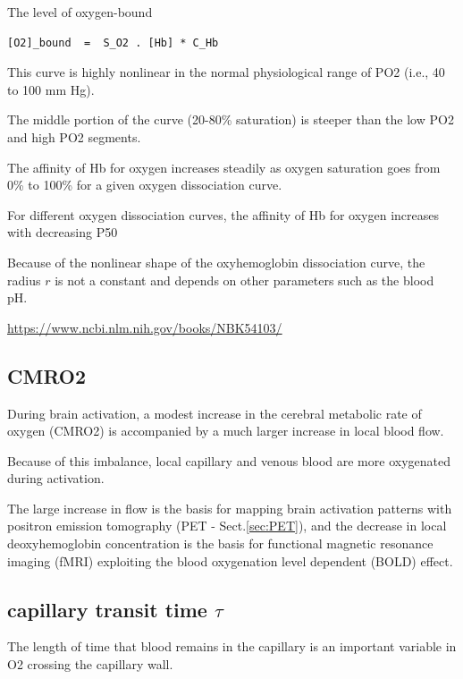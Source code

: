 The level of oxygen-bound
\begin{verbatim}
[O2]_bound  =  S_O2 . [Hb] * C_Hb 
\end{verbatim}


This curve is highly nonlinear in the normal physiological range of PO2 (i.e.,
40 to 100 mm Hg).

The middle portion of the curve (20-80\% saturation) is steeper than the low PO2
and high PO2 segments.

The affinity of Hb for oxygen increases steadily as oxygen saturation goes from
0\% to 100\% for a given oxygen dissociation curve.

For different oxygen dissociation curves, the affinity of Hb for oxygen
increases with decreasing P50





Because of the nonlinear shape of the oxyhemoglobin dissociation curve, the
radius $r$ is not a constant and depends on other parameters such as the blood
pH.



\url{https://www.ncbi.nlm.nih.gov/books/NBK54103/}




\subsection{CMRO2}
\label{sec:CMRO2}

During brain activation, a modest increase in the cerebral metabolic rate of
oxygen (CMRO2) is accompanied by a much larger increase in local blood flow.

Because of this imbalance, local capillary and venous blood are more oxygenated
during activation.

The large increase in flow is the basis for mapping brain activation patterns
with positron emission tomography (PET - Sect.\ref{sec:PET}), and the decrease
in local deoxyhemoglobin concentration is the basis for functional magnetic
resonance imaging (fMRI) exploiting the blood oxygenation level dependent (BOLD)
effect.

\subsection{capillary transit time $\tau$}

The length of time that blood remains in the capillary is an important variable
in O2 crossing the capillary wall. 

